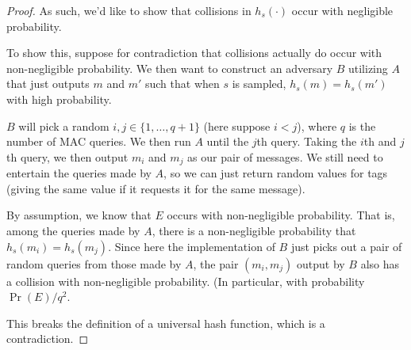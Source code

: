\documentclass[12pt]{tufte-book}
\begin{document}
\begin{proof}
    As such, we'd like to show that collisions in $h_s(\cdot)$ occur with negligible probability.

    To show this, suppose for contradiction that collisions actually do occur with non-negligible probability. We then want to construct an adversary $B$ utilizing $A$ that just outputs $m$ and $m'$ such that when $s$ is sampled, $h_s(m) = h_s(m')$ with high probability.

    $B$ will pick a random $i, j \in \{1, \ldots, q+1\}$ (here suppose $i < j$), where $q$ is the number of MAC queries. We then run $A$ until the $j$th query. Taking the $i$th and $j$th query, we then output $m_i$ and $m_j$ as our pair of messages. We still need to entertain the queries made by $A$, so we can just return random values for tags (giving the same value if it requests it for the same message).

    \begin{center}
    \end{center}

    By assumption, we know that $E$ occurs with non-negligible probability. That is, among the queries made by $A$, there is a non-negligible probability that $h_s(m_i) = h_s(m_j)$. Since here the implementation of $B$ just picks out a pair of random queries from those made by $A$, the pair $(m_i, m_j)$ output by $B$ also has a collision with non-negligible probability. (In particular, with probability $\Pr(E) / q^2$.

    This breaks the definition of a universal hash function, which is a contradiction.
\end{proof}
\end{document}
